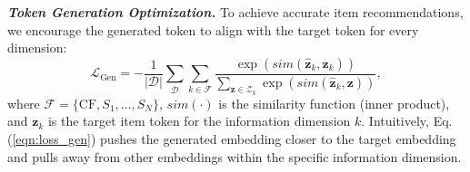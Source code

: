 \vspace{2pt}
\textbf{\textit{Token Generation Optimization.}} 
To achieve accurate item recommendations, 
we encourage the generated token to align with the target token for every dimension: 
\begin{equation}\label{eqn:loss_gen}
    \mathcal{L}_{\text{Gen}} = - \frac{1}{|\mathcal{D}|} \sum_{\mathcal{D}} \sum_{k\in\mathcal{F}}\frac{\exp (sim(\hat{\bm{z}}_k,\bm{z}_{k}))}{\sum_{\bm{z}\in\mathcal{Z}_k}\exp(sim(\hat{\bm{z}}_k,\bm{z}))},
\end{equation}
where $\mathcal{F}=\{\text{CF}, S_1, \dots, S_N\}$, $sim(\cdot)$ is the similarity function (\eg inner product), and $\bm{z}_k$ is the target item token for the information dimension $k$. 
Intuitively, Eq. (\ref{eqn:loss_gen}) pushes the generated embedding closer to the target embedding and pulls away from other embeddings within the specific information dimension.  


